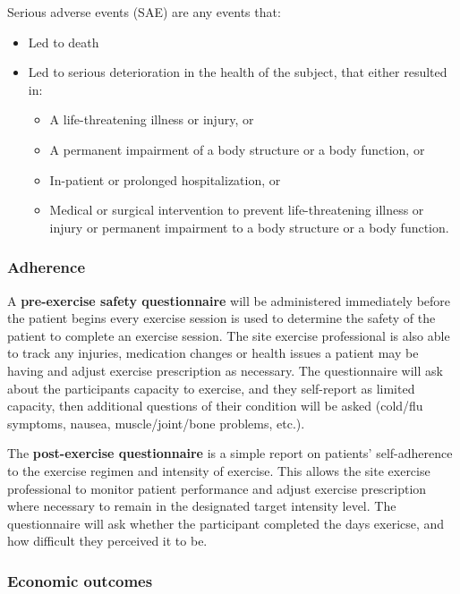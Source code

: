 \documentclass[11pt,parskip=half-]{scrartcl}
\providecommand{\tightlist}{%
  \setlength{\itemsep}{0pt}\setlength{\parskip}{0pt}}
\begin{document}
Serious adverse events (SAE) are any events that:
\begin{itemize}\tightlist
  \item Led to death
  \item Led to serious deterioration in the health of the subject, that either resulted in:
        \begin{itemize}\tightlist
          \item A life-threatening illness or injury, or
          \item A permanent impairment of a body structure or a body function, or
          \item In-patient or prolonged hospitalization, or
          \item Medical or surgical intervention to prevent life-threatening illness or injury or permanent impairment to a body structure or a body function.
        \end{itemize}
\end{itemize}

\subsubsection{Adherence}\label{adherence-outcomes}

A \textbf{pre-exercise safety questionnaire} will be administered immediately before the patient begins every exercise session is used to determine the safety of the patient to complete an exercise session. The site exercise professional is also able to track any injuries, medication changes or health issues a patient may be having and adjust exercise prescription as necessary. The questionnaire will ask about the participants capacity to exercise, and they self-report as limited capacity, then additional questions of their condition will be asked (cold/flu symptoms, nausea, muscle/joint/bone problems, etc.).

The \textbf{post-exercise questionnaire} is a simple report on patients’ self-adherence to the exercise regimen and intensity of exercise. This allows the site exercise professional to monitor patient performance and adjust exercise prescription where necessary to remain in the designated target intensity level. The questionnaire will ask whether the participant completed the days exericse, and how difficult they perceived it to be.

\subsubsection{Economic outcomes}\label{economic-outcomes}
\end{document}
